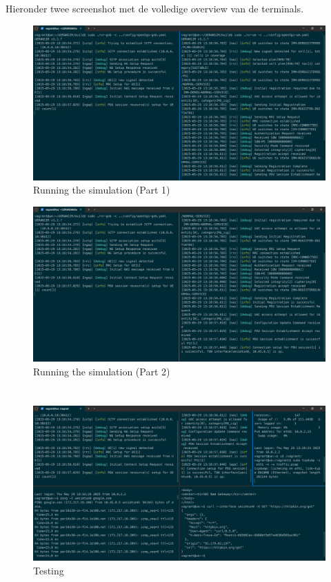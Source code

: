 Hieronder twee screenshot met de volledige overview van de terminals.

\begin{figure}[H]
    \includegraphics[width=\linewidth]{../graphics/POC-Run-1.png}
    \caption{Running the simulation (Part 1)}
    \label{fig:runPart1}
\end{figure}
\begin{figure}[H]
    \includegraphics[width=\linewidth]{../graphics/POC-Run-2.png}
    \caption{Running the simulation (Part 2)}
    \label{fig:runPart2}
\end{figure}

\section{}%
\label{sec:Test}%

\begin{figure}[H]
    \includegraphics[width=\linewidth]{../graphics/POC-test.png}
    \caption{Testing}
    \label{fig:Test-Overview}
\end{figure}

